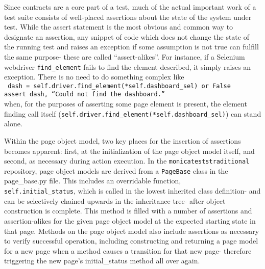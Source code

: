 Since contracts are a core part of a test, much of the actual important work of a test suite consists of well-placed assertions about the state of the system under test. While the assert statement is the most obvious and common way to designate an assertion, any snippet of code which does not change the state of the running test and raises an exception if some assumption is not true can fulfill the same purpose- these are called ``assert-alikes''. For instance, if a Selenium webdriver \texttt{find\_element} fails to find the element described, it simply raises an exception. There is no need to do something complex like\\
\texttt{
 dash = self.driver.find\_element(*self.dashboard\_sel) or False\\
 assert dash, ``Could not find the dashboard.''\\
}
when, for the purposes of asserting some page element is present, the element finding call itself (\texttt{self.driver.find\_element(*self.dashboard\_sel)}) can stand alone.

Within the page object model, two key places for the insertion of assertions becomes apparent: first, at the initialization of the page object model itself, and second, as necessary during action execution. In the \texttt{monica\-tests\-traditional} repository, page object models are derived from a \texttt{PageBase} class in the page\_base.py file. This includes an overridable function, \\\texttt{self.initial\_status}, which is called in the lowest inherited class definition- and can be selectively chained upwards in the inheritance tree- after object construction is complete. This method is filled with a number of assertions and assertion-alikes for the given page object model at the expected starting state in that page. Methods on the page object model also include assertions as necessary to verify successful operation, including constructing and returning a page model for a new page when a method causes a transition for that new page- therefore triggering the new page's initial\_status method all over again.
